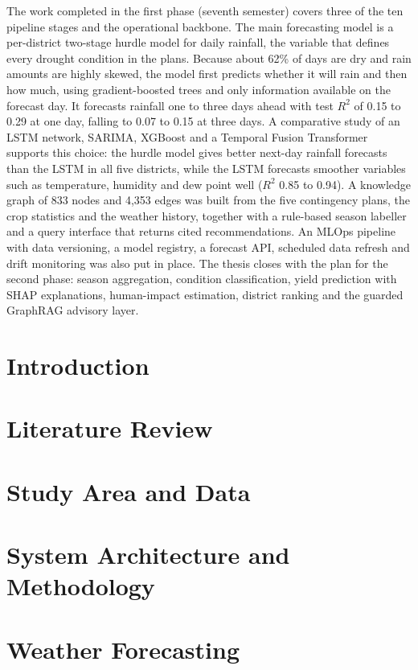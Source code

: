 \documentclass[a4paper, 12pt]{report}
\renewcommand{\_}{\textunderscore\allowbreak}
\theoremstyle{definition}
\begin{document}
The work completed in the first phase (seventh semester) covers three of the ten pipeline stages and the operational backbone. The main forecasting model is a per-district two-stage hurdle model for daily rainfall, the variable that defines every drought condition in the plans. Because about 62\% of days are dry and rain amounts are highly skewed, the model first predicts whether it will rain and then how much, using gradient-boosted trees and only information available on the forecast day. It forecasts rainfall one to three days ahead with test $R^2$ of 0.15 to 0.29 at one day, falling to 0.07 to 0.15 at three days. A comparative study of an LSTM network, SARIMA, XGBoost and a Temporal Fusion Transformer supports this choice: the hurdle model gives better next-day rainfall forecasts than the LSTM in all five districts, while the LSTM forecasts smoother variables such as temperature, humidity and dew point well ($R^2$ 0.85 to 0.94). A knowledge graph of 833 nodes and 4,353 edges was built from the five contingency plans, the crop statistics and the weather history, together with a rule-based season labeller and a query interface that returns cited recommendations. An MLOps pipeline with data versioning, a model registry, a forecast API, scheduled data refresh and drift monitoring was also put in place. The thesis closes with the plan for the second phase: season aggregation, condition classification, yield prediction with SHAP explanations, human-impact estimation, district ranking and the guarded GraphRAG advisory layer.

\clearpage
{}
\setcounter{page}{1}
\chapter{Introduction}

\chapter{Literature Review}

\chapter{Study Area and Data}

\chapter{System Architecture and Methodology}

\chapter{Weather Forecasting}

\end{document}
